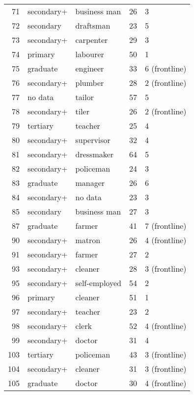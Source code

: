 \begin{longtable}{rllll}
71 & secondary+ & business man & 26 & 3 \\
72 & secondary & draftsman & 23 & 5 \\
73 & secondary+ & carpenter & 29 & 3\\
74 & primary & labourer & 50 & 1\\
75 & graduate & engineer & 33 & 6 (frontline)\\
76 & secondary+ & plumber & 28 & 2 (frontline)\\
77 & no data & tailor & 57 & 5 \\
78 & secondary+ & tiler & 26 & 2 (frontline)\\
79 & tertiary & teacher & 25 & 4 \\
80 & secondary+ & supervisor & 32 & 4 \\
81 & secondary+ & dressmaker & 64 & 5\\
82 & secondary+ & policeman & 24 & 3 \\
83 & graduate & manager & 26 & 6\\
84 & secondary+ & no data & 23 & 3\\
85 & secondary & business man & 27 & 3\\
87 & graduate & farmer & 41 & 7 (frontline)\\
90 & secondary+ & matron & 26 & 4 (frontline)\\
91 & secondary+ & farmer & 27 & 2\\
93 & secondary+ & cleaner & 28 & 3 (frontline)\\
95 & secondary+ & self-employed & 54 & 2\\
96 & primary & cleaner & 51 & 1\\
97 & secondary+ & teacher & 23 & 2\\
98 & secondary+ & clerk & 52 & 4 (frontline)\\
99 & secondary+ & doctor & 31 & 4\\
103 & tertiary & policeman & 43 & 3 (frontline)\\
104 & secondary+ & cleaner & 31 & 3 (frontline)\\
105 & graduate & doctor & 30 & 4 (frontline)\\
\end{longtable}
